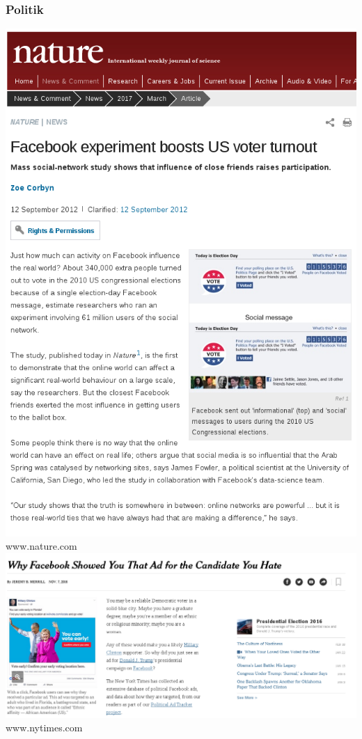\documentclass[12pt]{beamer}
\begin{document}
\begin{frame}
  \frametitle{Politik}
  \begin{center}
     {
      \includegraphics[height=0.7\textheight]{img/facebook_vote.png}
      \\ \tiny www.nature.com
    }
     {
      \includegraphics[height=0.5\textheight]{img/presidential.png}
      \\ \tiny www.nytimes.com
    }
  \end{center}
\end{frame}
\end{document}
